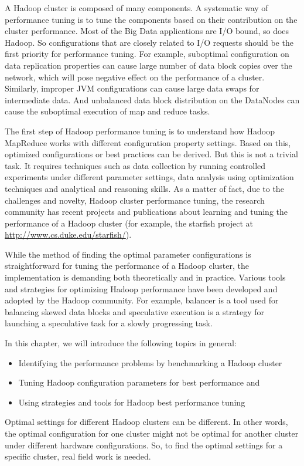 A Hadoop cluster is composed of many components. A systematic way of performance tuning is to tune the components based on their contribution on the cluster performance. Most of the Big Data applications are I/O bound, so does Hadoop. So configurations that are closely related to I/O requests should be the first priority for performance tuning. For example, suboptimal configuration on data replication properties can cause large number of data block copies over the network, which will pose negative effect on the performance of a cluster. Similarly, improper JVM configurations can cause large data swaps for intermediate data. And unbalanced data block distribution on the DataNodes can cause the suboptimal execution of map and reduce tasks.

The first step of Hadoop performance tuning is to understand how Hadoop MapReduce works with different configuration property settings. Based on this, optimized configurations or best practices can be derived. But this is not a trivial task. It requires techniques such as data collection by running controlled experiments under different parameter settings, data analysis using optimization techniques and analytical and reasoning skills. As a matter of fact, due to the challenges and novelty, Hadoop cluster performance tuning, the research community has recent projects and publications about learning and tuning the performance of a Hadoop cluster (for example, the starfish project at \url{http://www.cs.duke.edu/starfish/}).

While the method of finding the optimal parameter configurations is straightforward for tuning the performance of a Hadoop cluster, the implementation is demanding both theoretically and in practice. Various tools and strategies for optimizing Hadoop performance have been developed and adopted by the Hadoop community. For example, balancer is a tool used for balancing skewed data blocks and speculative execution is a strategy for launching a speculative task for a slowly progressing task.

In this chapter, we will introduce the following topics in general:
\begin{itemize}
  \item Identifying the performance problems by benchmarking a Hadoop cluster
  \item Tuning Hadoop configuration parameters for best performance and
  \item Using strategies and tools for Hadoop best performance tuning
\end{itemize}
Optimal settings for different Hadoop clusters can be different. In other words, the optimal configuration for one cluster might not be optimal for another cluster under different hardware configurations. So, to find the optimal settings for a specific cluster, real field work is needed.

